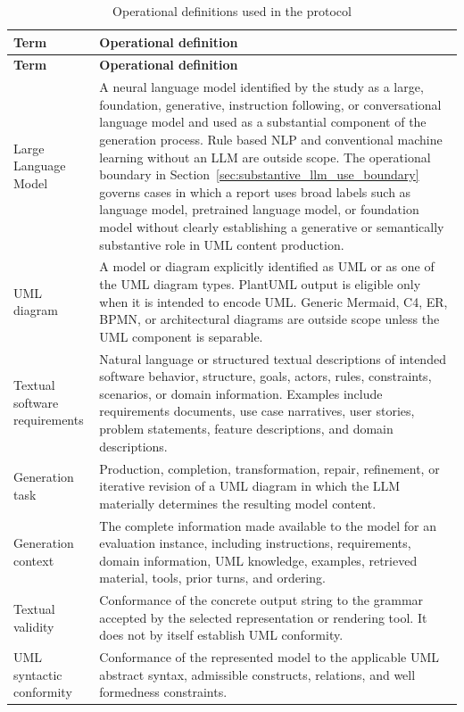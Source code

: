 \begin{longtable}{p{} p{}}
\caption{Operational definitions used in the protocol}
\label{tab:protocol_definitions}\\
\toprule
\textbf{Term} & \textbf{Operational definition} \\
\midrule
\endfirsthead
\toprule
\textbf{Term} & \textbf{Operational definition} \\
\midrule
\endhead
Large Language Model & A neural language model identified by the study as a large, foundation, generative, instruction following, or conversational language model and used as a substantial component of the generation process. Rule based NLP and conventional machine learning without an LLM are outside scope. The operational boundary in Section~\ref{sec:substantive_llm_use_boundary} governs cases in which a report uses broad labels such as language model, pretrained language model, or foundation model without clearly establishing a generative or semantically substantive role in UML content production. \\
UML diagram & A model or diagram explicitly identified as UML or as one of the UML diagram types. PlantUML output is eligible only when it is intended to encode UML. Generic Mermaid, C4, ER, BPMN, or architectural diagrams are outside scope unless the UML component is separable. \\
Textual software requirements & Natural language or structured textual descriptions of intended software behavior, structure, goals, actors, rules, constraints, scenarios, or domain information. Examples include requirements documents, use case narratives, user stories, problem statements, feature descriptions, and domain descriptions. \\
Generation task & Production, completion, transformation, repair, refinement, or iterative revision of a UML diagram in which the LLM materially determines the resulting model content. \\
Generation context & The complete information made available to the model for an evaluation instance, including instructions, requirements, domain information, UML knowledge, examples, retrieved material, tools, prior turns, and ordering. \\
Textual validity & Conformance of the concrete output string to the grammar accepted by the selected representation or rendering tool. It does not by itself establish UML conformity. \\
UML syntactic conformity & Conformance of the represented model to the applicable UML abstract syntax, admissible constructs, relations, and well formedness constraints. \\

\end{longtable}
